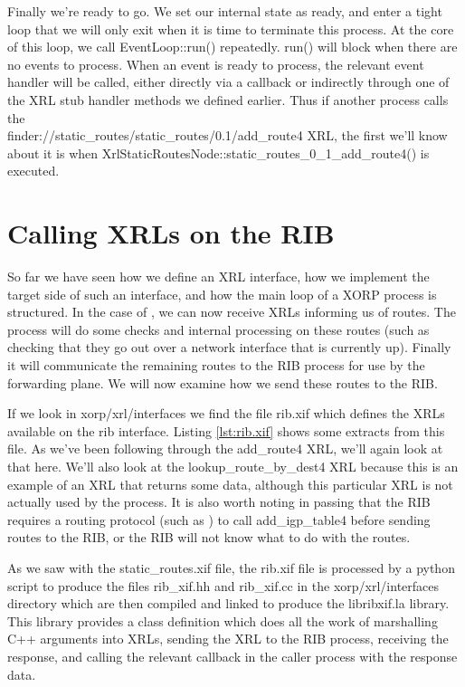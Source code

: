 \documentclass[11pt]{article}
\begin{document}
Finally we're ready to go.  We set our internal state as ready, and
enter a tight loop that we will only exit when it is time to terminate
this process.  At the core of this loop, we call {\stt
EventLoop::run()} repeatedly.  {\stt run()} will block when there are
no events to process.  When an event is ready to process, the relevant
event handler will be called, either directly via a {\stt callback} or
indirectly through one of the XRL stub handler methods we defined
earlier.  Thus if another process calls the \\{\stt
  finder://static\_routes/static\_routes/0.1/add\_route4} XRL, the
first we'll know about it is when {\stt
  XrlStaticRoutesNode::static\_routes\_0\_1\_add\_route4()} is executed.

\newpage

\section{Calling XRLs on the RIB}
\label{rib}

So far we have seen how we define an XRL interface, how we implement
the target side of such an interface, and how the main loop of a XORP
process is structured.  In the case of \SRI, we can now receive XRLs
informing us of routes.  The \SRI process will do some checks and
internal processing on these routes (such as checking that they go out
over a network interface that is currently up).  Finally it will
communicate the remaining routes to the RIB process for use by the
forwarding plane.  We will now examine how we send these routes to the
RIB.

If we look in {\stt xorp/xrl/interfaces} we find the file {\stt
rib.xif} which defines the XRLs available on the {\stt rib} interface.
Listing \ref{lst:rib.xif} shows some extracts from this file.  As
we've been following through the {\stt add\_route4} XRL, we'll again
look at that here.  We'll also look at the {\stt lookup\_route\_by\_dest4}
XRL because this is an example of an XRL that returns some data, although
this particular XRL is not actually used by the \SRI process. It is
also worth noting in passing that the RIB requires a routing protocol
(such as \SRI) to call {\stt add\_igp\_table4} before sending routes
to the RIB, or the RIB will not know what to do with the routes.

As we saw with the {\stt static\_routes.xif} file, the {\stt rib.xif}
file is processed by a python script to produce the files {\stt
rib\_xif.hh} and {\stt rib\_xif.cc} in the {\stt xorp/xrl/interfaces}
directory which are then compiled and linked to produce the {\stt
libribxif.la} library.  This library provides a class definition which
does all the work of marshalling C++ arguments into XRLs, sending the
XRL to the RIB process,  receiving the response, and calling the
relevant callback in the caller process with the response data.
\end{document}
